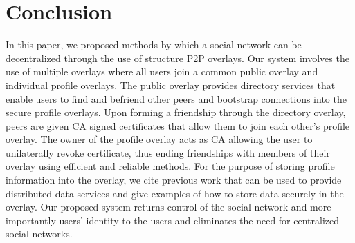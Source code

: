 \documentclass[letterpaper,twocolumn,10pt]{article}
\begin{document}
\section{Conclusion}
\label{conclusion}
In this paper, we proposed methods by which a social network can be
decentralized through the use of structure P2P overlays.  Our system involves
the use of multiple overlays where all users join a common public overlay and
individual profile overlays.  The public overlay provides directory services
that enable users to find and befriend other peers and bootstrap connections
into the secure profile overlays.  Upon forming a friendship through the
directory overlay, peers are given CA signed certificates that allow them to
join each other's profile overlay.  The owner of the profile overlay acts as
CA allowing the user to unilaterally revoke certificate, thus ending
friendships with members of their overlay using efficient and reliable methods.
For the purpose of storing profile information into the overlay, we cite
previous work that can be used to provide distributed data services and give
examples of how to store data securely in the overlay.  Our proposed system
returns control of the social network and more importantly users' identity to
the users and eliminates the need for centralized social networks.


\footnotesize{

\suppressfloats
}
\end{document}
